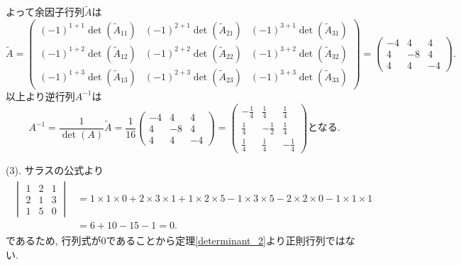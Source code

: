 \documentclass[dvipdfmx,a4paper,11pt]{article}
\theoremstyle{definition}
\begin{document}
よって余因子行列$\tilde{A}$は
$$
\tilde{A}
=
 \begin{pmatrix}
(-1)^{1+1}\det(\tilde{A}_{11})  & (-1)^{2+1} \det(\tilde{A}_{21})  &(-1)^{3+1}\det(\tilde{A}_{31})  \\
(-1)^{1+2}\det(\tilde{A}_{12})  & (-1)^{2+2}\det(\tilde{A}_{22})  & (-1)^{3+2}\det(\tilde{A}_{32}) \\
(-1)^{1+3}\det(\tilde{A}_{13})  & (-1)^{2+3}\det(\tilde{A}_{23})  &(-1)^{3+3}\det(\tilde{A}_{33}) 
 \end{pmatrix}
 =
 \begin{pmatrix}
-4  & 4 &4 \\
 4& -8 & 4\\
4& 4 & -4
 \end{pmatrix}.
$$
以上より逆行列$A^{-1}$は
$$
A^{-1} = \frac{1}{\det(A)}\tilde{A}
= \frac{1}{16}
 \begin{pmatrix}
-4  & 4 &4 \\
 4& -8 & 4\\
4& 4 & -4
 \end{pmatrix}
 = 
\begin{pmatrix}
-\frac{1}{4}  & \frac{1}{4}  & \frac{1}{4} \\
\frac{1}{4}  & -\frac{1}{2} & \frac{1}{4} \\
\frac{1}{4}  & \frac{1}{4}  & -\frac{1}{4} 
 \end{pmatrix} 
 \text{となる.}
$$

(3). サラスの公式より
\begin{align*}
\begin{split}
\begin{vmatrix}
1 &2&1 \\
2 & 1 & 3 \\
1&5 &0
 \end{vmatrix}
& =
1 \times 1 \times 0 + 2 \times 3 \times 1 + 1 \times 2 \times 5 
- 1 \times 3  \times 5 - 2 \times 2 \times 0 - 1 \times 1 \times 1 \\
 & = 6 + 10 - 15 -1 =0.
\end{split}
\end{align*}
であるため, 行列式が0であることから定理\ref{determinant_2}より正則行列ではない.
 
\end{document}
